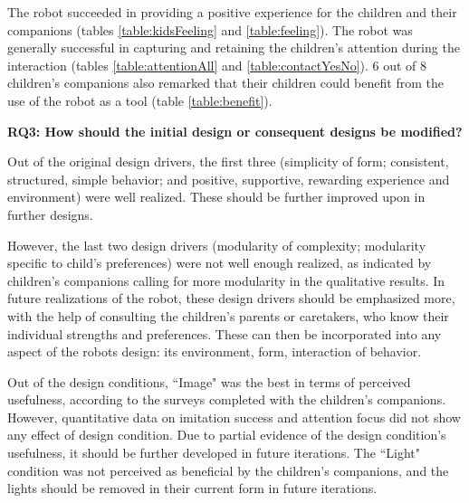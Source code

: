 The robot succeeded in providing a positive experience for the children and their companions (tables \ref{table:kidsFeeling} and \ref{table:feeling}). The robot was generally successful in capturing and retaining the children's attention during the interaction (tables \ref{table:attentionAll} and \ref{table:contactYesNo}). 6 out of 8 children's companions also remarked that their children could benefit from the use of the robot as a tool (table \ref{table:benefit}).

\vspace{3mm}
\noindent\textbf{RQ3: How should the initial design or consequent designs be modified?}
\vspace{1mm}

Out of the original design drivers, the first three (simplicity of form; consistent, structured, simple behavior; and positive, supportive, rewarding experience and environment) were well realized. These should be further improved upon in further designs. 

However, the last two design drivers (modularity of complexity; modularity specific to child's preferences) were not well enough realized, as indicated by children's companions calling for more modularity in the qualitative results. In future realizations of the robot, these design drivers should be emphasized more, with the help of consulting the children's parents or caretakers, who know their individual strengths and preferences. These can then be incorporated into any aspect of the robots design: its environment, form, interaction of behavior.

Out of the design conditions, ``Image" was the best in terms of perceived usefulness, according to the surveys completed with the children's companions. However, quantitative data on imitation success and attention focus did not show any effect of design condition. Due to partial evidence of the design condition's usefulness, it should be further developed in future iterations. The ``Light" condition was not perceived as beneficial by the children's companions, and the lights should be removed in their current form in future iterations.

